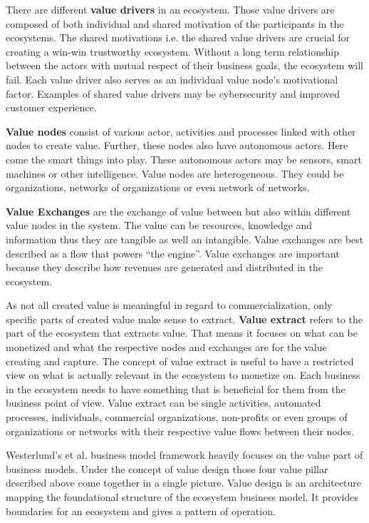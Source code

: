 		There are different \textbf{value drivers} in an ecosystem. Those value drivers are composed of both individual and shared motivation of the participants in the ecosystems. The shared motivations i.e. the shared value drivers are crucial for creating a win-win trustworthy ecosystem. Without a long term relationship between the actors with mutual respect of their business goals, the ecosystem will fail. Each value driver also serves as an individual value node's motivational factor. Examples of shared value drivers may be cybersecurity and improved customer experience.

		\textbf{Value nodes} consist of various actor, activities and processes linked with other nodes to create value. Further, these nodes also have autonomous actors. Here come the smart things into play. These autonomous actors may be sensors, smart machines or other intelligence. Value nodes are heterogeneous. They could be organizations, networks of organizations or even network of networks.

		\textbf{Value Exchanges} are the exchange of value between but also within different value nodes in the system. The value can be resources, knowledge and information thus they are tangible as well an intangible. Value exchanges are best described as a flow that powers ``the engine''. Value exchanges are important because they describe how revenues are generated and distributed in the ecosystem.

		As not all created value is meaningful in regard to commercialization, only specific parts of created value make sense to extract. \textbf{Value extract} refers to the part of the ecosystem that extracts value. That means it focuses on what can be monetized and what the respective nodes and exchanges are for the value creating and capture. The concept of value extract is useful to have a restricted view on what is actually relevant in the ecosystem to monetize on. Each business in the ecosystem needs to have something that is beneficial for them from the business point of view. Value extract can be single activities, automated processes, individuals, commercial organizations, non-profits or even groups of organizations or networks with their respective value flows between their nodes.

		Westerlund's et al. business model framework heavily focuses on the value part of business models. Under the concept of value design those four value pillar described above come together in a single picture. Value design is an architecture mapping the foundational structure of the ecosystem business model. It provides boundaries for an ecosystem and gives a pattern of operation.

